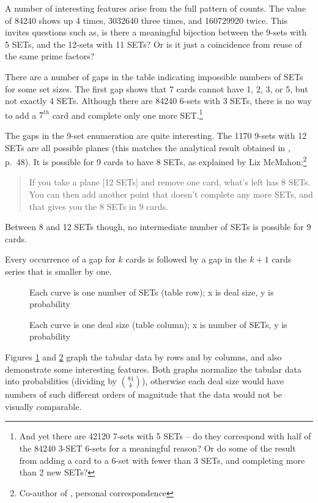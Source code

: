 \documentclass[10pt]{amsart}
\begin{document}
A number of interesting features arise from the full pattern of counts. The
value of 84240 shows up 4 times, 3032640 three times, and 160729920 twice. This
invites questions such as, is there a meaningful bijection between the 9-sets
with 5 SETs, and the 12-sets with 11 SETs? Or is it just a coincidence from
reuse of the same prime factors?


There are a number of gaps in the table indicating impossible numbers of SETs
for some set sizes. The first gap shows that 7 cards cannot have 1, 2, 3, or 5,
but not exactly 4 SETs. Although there are 84240 6-sets with 3 SETs, there is no
way to add a $7^{th}$ card and complete only one more SET.\footnote{And yet
  there are 42120 7-sets with 5 SETs -- do they correspond with half of the
  84240 3-SET 6-sets for a meaningful reason? Or do some of the result from
  adding a card to a 6-set with fewer than 3 SETs, and completing more than 2
  new SETs?}

The gaps in the 9-set enumeration are quite interesting. The 1170 9-sets with 12
SETs are all possible planes (this matches the analytical result obtained in
\cite{JOS}, p.~48). It is possible for 9 cards to have 8 SETs, as explained by
Liz McMahon:\footnote{Co-author of \cite{JOS}, personal correspondence}
\begin{quote}
If you take a plane [12 SETs] and remove one card, what’s left has 8 SETs.  You
can then add another point that doesn’t complete any more SETs, and that gives
you the 8 SETs in 9 cards.
\end{quote}
Between 8 and 12 SETs though, no intermediate number of SETs is possible for 9
cards.

Every occurrence of a gap for $k$ cards is followed by a gap in the $k+1$ cards
series that is smaller by one.

\begin{figure}[!htb]
  \caption{\label{FIGROWS} Each curve is one number of SETs (table row); x is
    deal size, y is probability}
\end{figure}

\begin{figure}[!htb]
  \caption{\label{FIGCOLS} Each curve is one deal size (table column); x is
    number of SETs, y is probability}
\end{figure}

Figures \ref{FIGROWS} and \ref{FIGCOLS} graph the tabular data by rows and by
columns, and also demonstrate some interesting features. Both graphs normalize
the tabular data into probabilities (dividing by $\binom{81}{k}$), otherwise
each deal size would have numbers of such different orders of magnitude that the
data would not be visually comparable.
\end{document}
